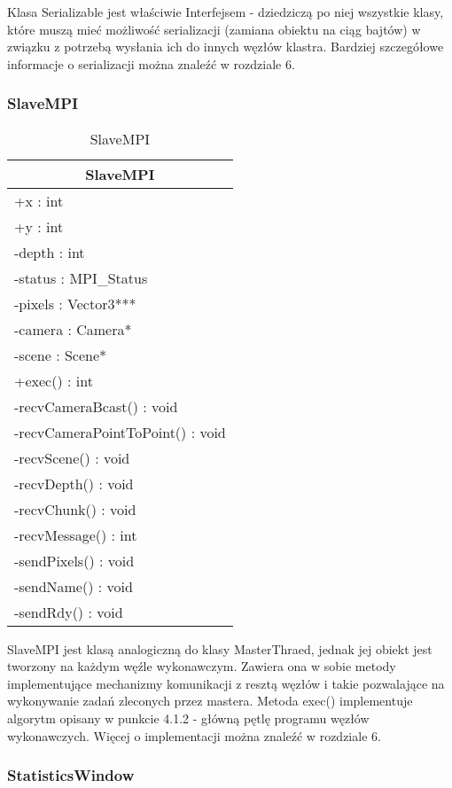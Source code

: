 Klasa Serializable jest właściwie Interfejsem - dziedziczą po niej wszystkie klasy, które muszą mieć możliwość serializacji (zamiana obiektu na ciąg bajtów) w związku z potrzebą wysłania ich do innych węzłów klastra. Bardziej szczegółowe informacje o serializacji można znaleźć w rozdziale 6.

\subsubsection{SlaveMPI}

\footnotesize
\begin{longtable}{|p{14cm}|}
    \caption{SlaveMPI} \label{tab:SlaveMPI} \\ \hline
    \multicolumn{1}{|c|}{SlaveMPI} \\ \hline
    +x : int \\ 
	+y : int \\
	-depth : int \\
	-status : MPI\_Status \\
	-pixels : Vector3*** \\
	-camera : Camera* \\
	-scene : Scene* \\ \hline
	+exec() : int \\
	-recvCameraBcast() : void \\
	-recvCameraPointToPoint() : void \\
	-recvScene() : void \\
	-recvDepth() : void \\
	-recvChunk() : void \\
	-recvMessage() : int \\
	-sendPixels() : void \\
	-sendName() : void \\
	-sendRdy() : void \\
	\hline
\end{longtable}
\normalsize

SlaveMPI jest klasą analogiczną do klasy MasterThraed, jednak jej obiekt jest tworzony na każdym węźle wykonawczym. Zawiera ona w sobie metody implementujące mechanizmy komunikacji z resztą węzłów i takie pozwalające na wykonywanie zadań zleconych przez mastera. Metoda exec() implementuje algorytm opisany w punkcie 4.1.2 - główną pętlę programu węzłów wykonawczych. Więcej o implementacji można znaleźć w rozdziale 6.

\subsubsection{StatisticsWindow}

